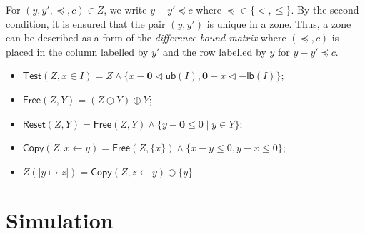 \documentclass{llncs}
\newcommand{\ulim}[1]{\mathsf{ub}(#1)}
\newcommand{\llim}[1]{\mathsf{lb}(#1)}
\newcommand{\zsub}[1]{(\!\vert{#1}\vert\!)}
\begin{document}
For $(y,y',\preceq,c)\in Z$, we write $y-y'\preceq c$ where $\preceq\in\{<,\leq\}$.
By the second condition, it is ensured that the pair $(y,y')$ is unique in a zone.
Thus, a zone can be described as a form of the {\em difference bound matrix} where
$(\preceq, c)$ is placed in the column labelled by $y'$ and the row labelled by $y$
for $y-y'\preceq c$.





\begin{itemize}
  \item $\mathsf{Test}(Z,x\in I)=Z\wedge\{x-\mathbf{0}\triangleleft\ulim{I},\mathbf{0}-x\triangleleft-\llim{I}\}$;
  \item $\mathsf{Free}(Z,Y)=(Z\ominus Y)\oplus Y$;
  \item $\mathsf{Reset}(Z,Y)=\mathsf{Free}(Z,Y)\wedge\{y-\mathbf{0}\leq 0\;|\;y\in Y\}$;
  \item $\mathsf{Copy}(Z,x\leftarrow y)=\mathsf{Free}(Z,\{x\})\wedge\{x-y\leq 0,y-x\leq 0\}$;
  \item $Z\zsub{y\mapsto z}=\mathsf{Copy}(Z,z\leftarrow y)\ominus\{y\}$
\end{itemize}

\section{Simulation}
\end{document}
